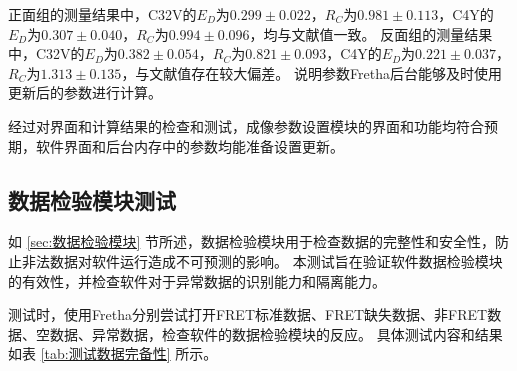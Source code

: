 正面组的测量结果中，C32V的$E_D$为$0.299\pm0.022$，$R_C$为$0.981\pm0.113$，C4Y的$E_D$为$0.307\pm0.040$，$R_C$为$0.994\pm0.096$，均与文献值一致。
反面组的测量结果中，C32V的$E_D$为$0.382\pm0.054$，$R_C$为$0.821\pm0.093$，C4Y的$E_D$为$0.221\pm0.037$，$R_C$为$1.313\pm0.135$，与文献值存在较大偏差。
说明参数Fretha后台能够及时使用更新后的参数进行计算。

经过对界面和计算结果的检查和测试，成像参数设置模块的界面和功能均符合预期，软件界面和后台内存中的参数均能准备设置更新。

\subsection{数据检验模块测试}
如 \ref{sec:数据检验模块} 节所述，数据检验模块用于检查数据的完整性和安全性，防止非法数据对软件运行造成不可预测的影响。
本测试旨在验证软件数据检验模块的有效性，并检查软件对于异常数据的识别能力和隔离能力。

测试时，使用Fretha分别尝试打开FRET标准数据、FRET缺失数据、非FRET数据、空数据、异常数据，检查软件的数据检验模块的反应。
具体测试内容和结果如表 \ref{tab:测试数据完备性} 所示。


